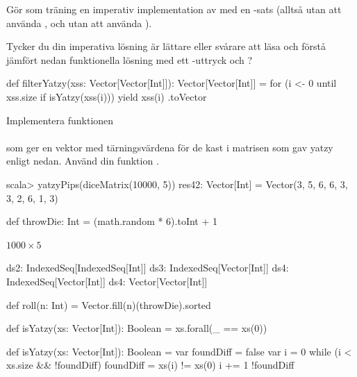 \Subtask Gör som träning en imperativ implementation av  med en -sats (alltså utan att använda , och utan att använda ).


\Subtask Tycker du din imperativa lösning är lättare eller svårare att läsa och förstå jämfört nedan funktionella lösning med ett -uttryck och ?
\begin{CodeSmall}
def filterYatzy(xss: Vector[Vector[Int]]): Vector[Vector[Int]] = {
  for (i <- 0 until xss.size if isYatzy(xss(i))) yield xss(i)
}.toVector
\end{CodeSmall}

\Subtask Implementera funktionen \\
 \\ som ger en vektor med tärningsvärdena för de kast i matrisen  som gav yatzy enligt nedan. Använd din funktion .
\begin{REPL}
scala> yatzyPips(diceMatrix(10000, 5))
res42: Vector[Int] = Vector(3, 5, 6, 6, 3, 3, 2, 6, 1, 3)
\end{REPL}

\SOLUTION

\TaskSolved \what

\SubtaskSolved  \begin{Code}
def throwDie: Int = (math.random * 6).toInt + 1
\end{Code}

\SubtaskSolved  $1000 \times 5$

\SubtaskSolved
\begin{Code}
ds2: IndexedSeq[IndexedSeq[Int]]
ds3: IndexedSeq[Vector[Int]]
ds4: IndexedSeq[Vector[Int]]
ds4: Vector[Vector[Int]]
\end{Code}


\SubtaskSolved  \begin{Code}
def roll(n: Int) = Vector.fill(n)(throwDie).sorted
\end{Code}

\SubtaskSolved  \begin{Code}
def isYatzy(xs: Vector[Int]): Boolean = xs.forall(_ == xs(0))
\end{Code}

\SubtaskSolved  \begin{Code}
def isYatzy(xs: Vector[Int]): Boolean = {
	var foundDiff = false
	var i = 0
	while (i < xs.size && !foundDiff) {
		foundDiff = xs(i) != xs(0)
		i += 1
	}
	!foundDiff
}
\end{Code}


